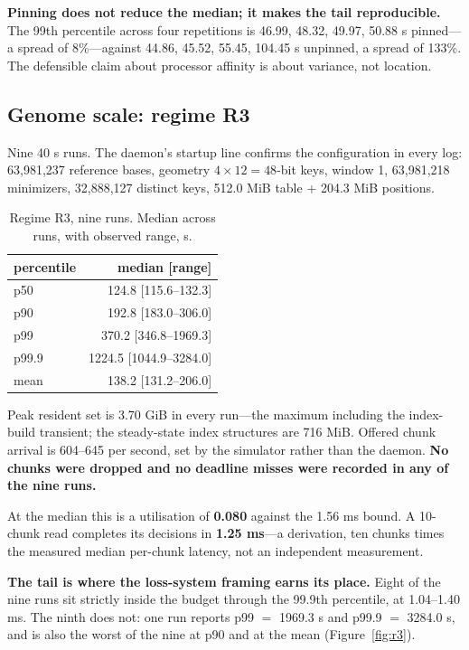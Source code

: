 \documentclass[sigconf,nonacm]{acmart}
\begin{document}
\textbf{Pinning does not reduce the median; it makes the tail reproducible.} The 99th percentile
across four repetitions is 46.99, 48.32, 49.97, 50.88 \textmu{}s pinned---a spread of 8\%---against
44.86, 45.52, 55.45, 104.45 \textmu{}s unpinned, a spread of 133\%. The defensible claim about
processor affinity is about variance, not location.

\subsection{Genome scale: regime R3}

Nine 40 s runs. The daemon's startup line confirms the configuration in every log: 63,981,237
reference bases, geometry $4 \times 12 = 48$-bit keys, window 1, 63,981,218 minimizers,
32,888,127 distinct keys, 512.0 MiB table + 204.3 MiB positions.

\begin{table}[t]
\caption{Regime R3, nine runs. Median across runs, with observed range, \textmu{}s.}
\label{tab:r3}
\small
\begin{tabular}{lr}
\toprule
percentile & median [range] \\
\midrule
p50   & 124.8 [115.6--132.3] \\
p90   & 192.8 [183.0--306.0] \\
p99   & 370.2 [346.8--1969.3] \\
p99.9 & 1224.5 [1044.9--3284.0] \\
mean  & 138.2 [131.2--206.0] \\
\bottomrule
\end{tabular}
\end{table}

Peak resident set is 3.70 GiB in every run---the maximum including the index-build transient;
the steady-state index structures are 716 MiB. Offered chunk arrival is 604--645 per second, set
by the simulator rather than the daemon. \textbf{No chunks were dropped and no deadline misses
were recorded in any of the nine runs.}

At the median this is a utilisation of \textbf{0.080} against the 1.56 ms bound. A 10-chunk read
completes its decisions in \textbf{1.25 ms}---a derivation, ten chunks times the measured median
per-chunk latency, not an independent measurement.

\textbf{The tail is where the loss-system framing earns its place.} Eight of the nine runs sit
strictly inside the budget through the 99.9th percentile, at 1.04--1.40 ms. The ninth does not:
one run reports p99 $=$ 1969.3 \textmu{}s and p99.9 $=$ 3284.0 \textmu{}s, and is also the worst of the nine at
p90 and at the mean (Figure~\ref{fig:r3}).
\end{document}
